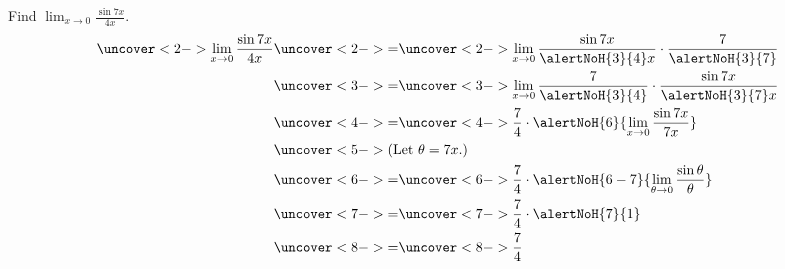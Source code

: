 \begin{frame}
\begin{example}%
Find $\lim_{x\rightarrow 0}\frac{\sin 7x}{4x}$.
\abovedisplayskip=0pt
\belowdisplayskip=0pt
\abovedisplayshortskip=0pt
\belowdisplayshortskip=0pt
\begin{align*}
\uncover<2->{%
\lim_{x\rightarrow 0} \frac{\sin 7x}{4x}%
}%
& \uncover<2->{ = }  %
\uncover<2->{%
\lim_{x\rightarrow 0} \frac{\sin 7x}{\alertNoH{ 3}{4}x}\cdot \frac{7}{\alertNoH{ 3}{7}}%
}\\%
& \uncover<3->{ = }  %
\uncover<3->{%
\lim_{x\rightarrow 0} \frac{7}{\alertNoH{ 3}{4}}\cdot \frac{\sin 7x}{\alertNoH{ 3}{7}x}%
}\\%
& \uncover<4->{ = }  %
\uncover<4->{%
\frac{7}{4}\cdot \alertNoH{ 6}{\lim_{x\rightarrow 0}  \frac{\sin 7x}{7x}}%
}\\%
&  \uncover<5->{\text{(Let $\theta = 7x$.)}}\\%
& \uncover<6->{ = }  %
\uncover<6->{%
\frac{7}{4}\cdot \alertNoH{ 6-7}{\lim_{\theta \rightarrow 0}  \frac{\sin \theta}{\theta}}%
}\\%
& \uncover<7->{ = }  %
\uncover<7->{%
\frac{7}{4}\cdot \alertNoH{ 7}{1}%
}\\%
& \uncover<8->{ = }  %
\uncover<8->{%
\frac{7}{4}%
}%
\end{align*}
\end{example}
\end{frame}
